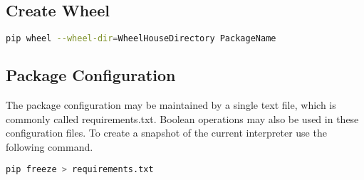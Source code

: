 \subsection{Create Wheel}
\begin{lstlisting}[language=bash, numbers=none]
pip wheel --wheel-dir=WheelHouseDirectory PackageName
\end{lstlisting}

\subsection{Package Configuration}
The package configuration may be maintained by a single text file, which is
commonly called requirements.txt. Boolean operations may also be used in these
configuration files. To create a snapshot of the current interpreter use the
following command.
\begin{lstlisting}[language=bash, numbers=none]
pip freeze > requirements.txt
\end{lstlisting}
